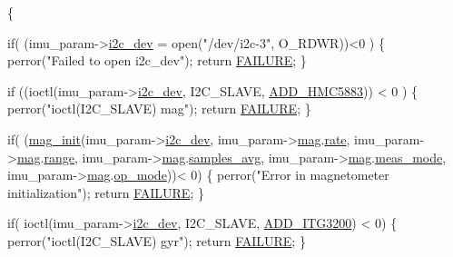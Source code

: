 \begin{DoxyCode}
\{
  
  \textcolor{keywordflow}{if}( (imu\_param->\hyperlink{structIMU__PARAM__STRUCT_a8a870f383fc9ba0b682fdc9b8c0d2734}{i2c\_dev} = open(\textcolor{stringliteral}{"/dev/i2c-3"}, O\_RDWR))<0 )
  \{
    perror(\textcolor{stringliteral}{"Failed to open i2c\_dev"});
    \textcolor{keywordflow}{return} \hyperlink{calibration_2calibration_8h_a6d58f9ac447476b4e084d7ca383f5183}{FAILURE};
  \}

  \textcolor{keywordflow}{if} ((ioctl(imu\_param->\hyperlink{structIMU__PARAM__STRUCT_a8a870f383fc9ba0b682fdc9b8c0d2734}{i2c\_dev}, I2C\_SLAVE, \hyperlink{communication_2imu__functions_8h_a383c09d3e3bbe30097f7eb8d081fb856}{ADD\_HMC5883})) < 0
      ) \{
                perror(\textcolor{stringliteral}{"ioctl(I2C\_SLAVE) mag"});
                \textcolor{keywordflow}{return} \hyperlink{calibration_2calibration_8h_a6d58f9ac447476b4e084d7ca383f5183}{FAILURE};
  \}

  \textcolor{keywordflow}{if}( (\hyperlink{communication_2imu__functions_8h_a014f908c9faa37c1ec75177a17012a01}{mag\_init}(imu\_param->\hyperlink{structIMU__PARAM__STRUCT_a8a870f383fc9ba0b682fdc9b8c0d2734}{i2c\_dev}, imu\_param->\hyperlink{structIMU__PARAM__STRUCT_a26b277dcaf05f3842995df888225f6f4}{mag}.\hyperlink{structIMU__PARAM__STRUCT_1_1param__mag_a234de95423b604b05b851ef90890cea1}{rate}, 
      imu\_param->\hyperlink{structIMU__PARAM__STRUCT_a26b277dcaf05f3842995df888225f6f4}{mag}.\hyperlink{structIMU__PARAM__STRUCT_1_1param__mag_a40ad27ebdb5fde35257b1dc52e40f476}{range}, imu\_param->\hyperlink{structIMU__PARAM__STRUCT_a26b277dcaf05f3842995df888225f6f4}{mag}.\hyperlink{structIMU__PARAM__STRUCT_1_1param__mag_a52c22cae6940eb39fb72aca66cfeba9a}{samples\_avg}, 
      imu\_param->\hyperlink{structIMU__PARAM__STRUCT_a26b277dcaf05f3842995df888225f6f4}{mag}.\hyperlink{structIMU__PARAM__STRUCT_1_1param__mag_a1f3536709c05310005d648f339d70c54}{meas\_mode}, imu\_param->\hyperlink{structIMU__PARAM__STRUCT_a26b277dcaf05f3842995df888225f6f4}{mag}.\hyperlink{structIMU__PARAM__STRUCT_1_1param__mag_a39b83b3e9ff5bdcafed0bdf6a2de584b}{op\_mode}))< 0)
  \{
      perror(\textcolor{stringliteral}{"Error in magnetometer initialization"});
      \textcolor{keywordflow}{return} \hyperlink{calibration_2calibration_8h_a6d58f9ac447476b4e084d7ca383f5183}{FAILURE};
  \}  

  \textcolor{keywordflow}{if}( ioctl(imu\_param->\hyperlink{structIMU__PARAM__STRUCT_a8a870f383fc9ba0b682fdc9b8c0d2734}{i2c\_dev}, I2C\_SLAVE, \hyperlink{communication_2imu__functions_8h_ab9fd1068a3f5fcba24d92918aaf0dcb5}{ADD\_ITG3200}) < 0) 
      \{
                perror(\textcolor{stringliteral}{"ioctl(I2C\_SLAVE) gyr"});
                \textcolor{keywordflow}{return} \hyperlink{calibration_2calibration_8h_a6d58f9ac447476b4e084d7ca383f5183}{FAILURE};
  \} 


\end{DoxyCode}
